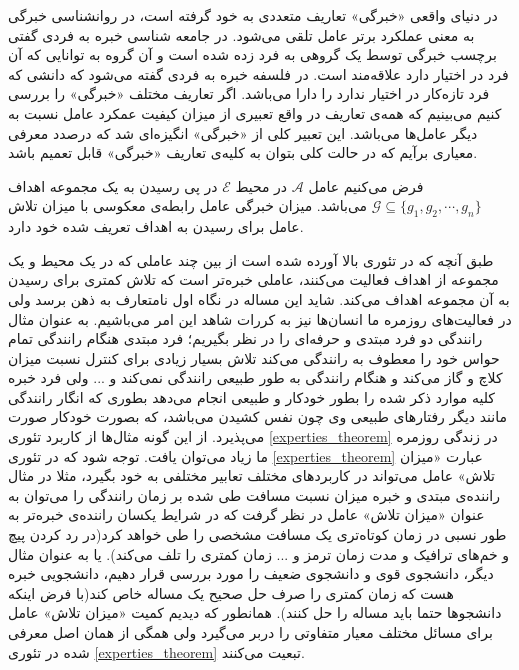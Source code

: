 در دنیای واقعی «خبرگی» تعاریف متعددی به خود گرفته است، در روانشناسی خبرگی به معنی عملکرد برتر عامل تلقی می‌شود. در جامعه شناسی خبره به فردی گفتی برچسب خبرگی توسط یک گروهی به فرد زده شده است و آن گروه به توانایی که آن فرد در اختیار دارد علاقه‌مند است. در فلسفه خبره به فردی گفته می‌شود که دانشی که فرد تازه‌کار در اختیار ندارد را دارا می‌باشد. اگر تعاریف مختلف «خبرگی» را بررسی کنیم می‌بینیم که همه‌ی تعاریف در واقع تعبیری از میزان کیفیت عمکرد عامل نسبت به دیگر عامل‌ها می‌باشد. این تعبیر کلی از «خبرگی» انگیزه‌ای شد که درصدد معرفی معیاری برآیم که در حالت کلی بتوان به کلیه‌ی تعاریف «خبرگی» قابل تعمیم باشد.

\begin{theorem}[خبرگی]\setstretch{\thebaselinestretch}\label{experties_theorem}
فرض می‌کنیم عامل $\mathcal{A}$ در محیط $\mathcal{E}$ در پی رسیدن به یک مجموعه اهداف 
$\mathcal{G} \subseteq \{g_1, g_2, \cdots, g_n\}$
می‌باشد. میزان خبرگی عامل رابطه‌ی معکوسی با میزان تلاش عامل برای رسیدن به اهداف تعریف شده خود دارد.
\end{theorem}

طبق آنچه که در تئوری بالا آورده شده است از بین چند عاملی که در یک محیط و یک مجموعه از اهداف فعالیت می‌کنند، عاملی خبره‌تر است که تلاش کمتری برای رسیدن به آن مجموعه اهداف می‌کند. شاید این مساله در نگاه اول نامتعارف به ذهن برسد ولی در فعالیت‌های روزمره ما انسان‌ها نیز به کررات شاهد این امر می‌باشیم. به عنوان مثال رانندگی دو فرد مبتدی و حرفه‌ای را در نظر بگیریم؛ فرد مبتدی هنگام رانندگی تمام حواس خود را معطوف به رانندگی می‌کند تلاش بسیار زیادی برای کنترل نسبت میزان کلاچ و گاز می‌کند و هنگام رانندگی به طور طبیعی رانندگی نمی‌کند و ... ولی فرد خبره کلیه موارد ذکر شده را بطور خودکار و طبیعی انجام می‌دهد بطوری که انگار رانندگی مانند دیگر رفتارهای طبیعی وی چون نفس کشیدن می‌باشد، که بصورت خودکار صورت می‌پذیرد. از این گونه مثال‌ها از کاربرد تئوری
\ref{experties_theorem}
در زندگی روزمره ما زیاد می‌توان یافت.
توجه شود که در تئوری
\ref{experties_theorem}
عبارت «میزان تلاش» عامل می‌تواند در کاربردهای مختلف تعابیر مختلفی به خود بگیرد، مثلا در مثال راننده‌ی مبتدی و خبره میزان نسبت مسافت طی شده بر زمان رانندگی را می‌توان به عنوان «میزان تلاش» عامل در نظر گرفت که در شرایط یکسان راننده‌ی خبره‌تر به طور نسبی در زمان کوتاه‌تری یک مسافت مشخصی را طی خواهد کرد(در رد کردن پیچ و خم‌های ترافیک و مدت زمان ترمز و ... زمان کمتری را تلف می‌کند). یا به عنوان مثال دیگر، دانشجوی قوی و دانشجوی ضعیف را مورد بررسی قرار دهیم، دانشجویی خبره هست که زمان کمتری را صرف حل صحیح یک مساله خاص کند(با فرض اینکه دانشجوها حتما باید مساله را حل کنند). همانطور که دیدیم کمیت «میزان تلاش» عامل برای مسائل مختلف معیار متفاوتی را دربر می‌گیرد ولی همگی از همان اصل معرفی شده در تئوری
\ref{experties_theorem}
تبعیت می‌کنند.

